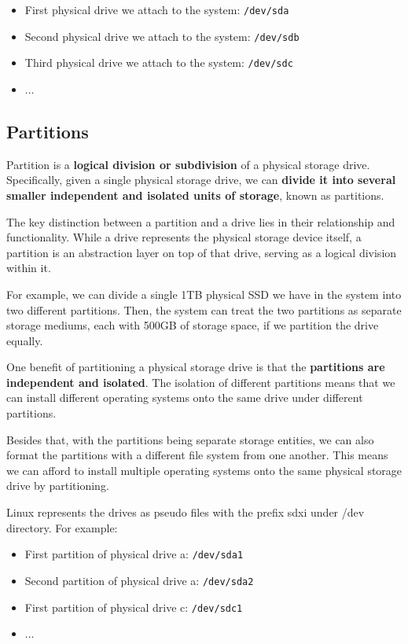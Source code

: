 \documentclass{article}
\begin{document}
\begin{itemize}
    \item First physical drive we attach to the system: \verb|/dev/sda|
    \item Second physical drive we attach to the system: \verb|/dev/sdb|
    \item Third physical drive we attach to the system: \verb|/dev/sdc|
    \item ...
\end{itemize}

\subsection{Partitions}
Partition is a \textbf{logical division or subdivision} of a physical storage drive. Specifically, given a single physical storage drive, we can \textbf{divide it into several smaller independent and isolated units of storage}, known as partitions.

The key distinction between a partition and a drive lies in their relationship and functionality. While a drive represents the physical storage device itself, a partition is an abstraction layer on top of that drive, serving as a logical division within it.

For example, we can divide a single 1TB physical SSD we have in the system into two different partitions. Then, the system can treat the two partitions as separate storage mediums, each with 500GB of storage space, if we partition the drive equally.

One benefit of partitioning a physical storage drive is that the \textbf{partitions are independent and isolated}. The isolation of different partitions means that we can install different operating systems onto the same drive under different partitions.

Besides that, with the partitions being separate storage entities, we can also format the partitions with a different file system from one another. This means we can afford to install multiple operating systems onto the same physical storage drive by partitioning.

Linux represents the drives as pseudo files with the prefix sdxi under /dev directory. For example:
\begin{itemize}
    \item First partition of physical drive a: \verb|/dev/sda1|
    \item Second partition of physical drive a: \verb|/dev/sda2|
    \item First partition of physical drive c: \verb|/dev/sdc1|
    \item ...
\end{itemize}
\end{document}
